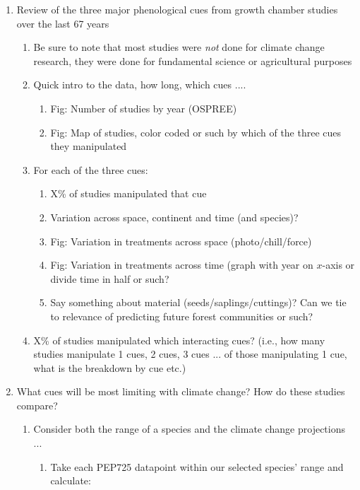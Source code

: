 \documentclass[11pt,letterpaper]{article}
\begin{document}
\begin{enumerate}
\begin{enumerate}
\begin{enumerate}
\end{enumerate}
\end{enumerate}
\item Review of the three major phenological cues from growth chamber studies over the last 67 years %
\begin{enumerate}
\item Be sure to note that most studies were \emph{not} done for climate change research, they were done for fundamental science or agricultural purposes 
\item Quick intro to the data, how long, which cues .... 
\begin{enumerate}
\item Fig: Number of studies by year (OSPREE)
\item Fig: Map of studies, color coded or such by which of the three cues they manipulated
\end{enumerate}
\item For each of the three cues:
\begin{enumerate}
\item  X\% of studies manipulated that cue
\item Variation across space, continent and time (and species)? 
\item Fig: Variation in treatments across space (photo/chill/force)
\item Fig: Variation in treatments across time (graph with year on $x$-axis or divide time in half or such? 
\item Say something about material (seeds/saplings/cuttings)? Can we tie to relevance of predicting future forest communities or such?
\end{enumerate}
\item X\% of studies manipulated which interacting cues? (i.e., how many studies manipulate 1 cues, 2 cues, 3 cues ... of those manipulating 1 cue, what is the breakdown by cue etc.)
\end{enumerate}
\item What cues will be most limiting with climate change? How do these studies compare? 
\begin{enumerate}
\item Consider both the range of a species and the climate change projections ...
\begin{enumerate}
\item Take each PEP725 datapoint within our selected species' range and calculate:

\end{enumerate}
\end{enumerate}
\end{enumerate}
\end{document}
